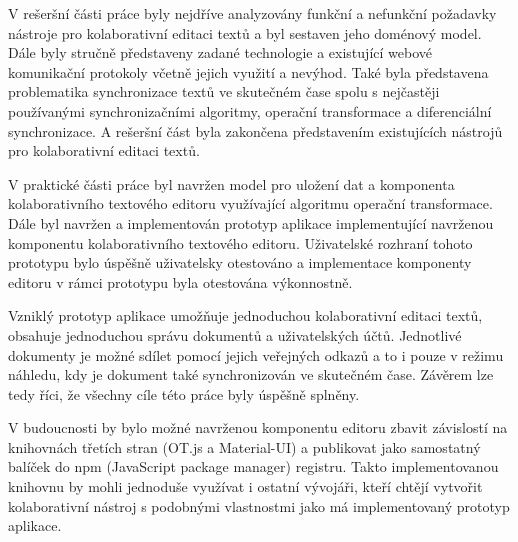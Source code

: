 
\begin{conclusion}

    V rešeršní části práce byly nejdříve analyzovány funkční a nefunkční požadavky nástroje pro kolaborativní editaci textů a byl sestaven jeho doménový model.
    Dále byly stručně představeny zadané technologie a existující webové komunikační protokoly včetně jejich využití a nevýhod.
    Také byla představena problematika synchronizace textů ve skutečném čase spolu s nejčastěji používanými synchronizačními algoritmy, operační transformace a diferenciální synchronizace.
    A rešeršní část byla zakončena představením existujících nástrojů pro kolaborativní editaci textů.

    V praktické části práce byl navržen model pro uložení dat a komponenta kolaborativního textového editoru využívající algoritmu operační transformace.
    Dále byl navržen a implementován prototyp aplikace implementující navrženou komponentu kolaborativního textového editoru.
    Uživatelské rozhraní tohoto prototypu bylo úspěšně uživatelsky otestováno a implementace komponenty editoru v rámci prototypu byla otestována výkonnostně.

    Vzniklý prototyp aplikace umožňuje jednoduchou kolaborativní editaci textů, obsahuje jednoduchou správu dokumentů a uživatelských účtů.
    Jednotlivé dokumenty je možné sdílet pomocí jejich veřejných odkazů a to i pouze v režimu náhledu, kdy je dokument také synchronizován ve skutečném čase.
    Závěrem lze tedy říci, že všechny cíle této práce byly úspěšně splněny.

    V budoucnosti by bylo možné navrženou komponentu editoru zbavit závislostí na knihovnách třetích stran (OT.js a Material-UI) a publikovat jako samostatný balíček do npm (JavaScript package manager) registru.
    Takto implementovanou knihovnu by mohli jednoduše využívat i ostatní vývojáři, kteří chtějí vytvořit kolaborativní nástroj s podobnými vlastnostmi jako má implementovaný prototyp aplikace.

\end{conclusion}
